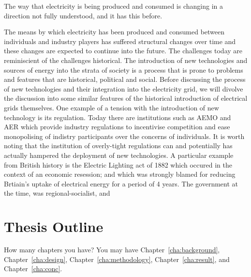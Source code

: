 The way that electricity is being produced and consumed is changing in a direction not fully understood, and it has this before.

The means by which electricity has been produced and consumed between individuals and industry players has suffered structural changes over time and these changes are expected to continue into the future.
The challenges today are reminiscient of the challenges historical.
The introduction of new technologies and sources of energy into the strata of society is a process that is prone to problems and features that are historical, political and social.
Before discussing the process of new technologies and their integration into the electricity grid, we will divolve the discussion into some similar features of the historical introduction of electrical grids themselves.
One example of a tension with the introduction of new technology is its regulation.
Today there are institutions such as AEMO and AER which provide industry regulations to incentivise competition and ease monopolising of indistry participants over the concerns of individuals.
It is worth noting that the institution of overly-tight regulations can and potentially has actually hampered the deployment of new technologies.
A particular example from British history is the Electric Lighting act of 1882 which occured in the context of an economic resession; and which was strongly blamed for reducing Brtiain's uptake of electrical energy for a period of 4 years.
The government at the time, was regional-socialist, and





\section{Thesis Outline}
\label{sec:outline}
How many chapters you have? You may have Chapter~\ref{cha:background},
Chapter~\ref{cha:design}, Chapter~\ref{cha:methodology},
Chapter~\ref{cha:result}, and Chapter~\ref{cha:conc}.
